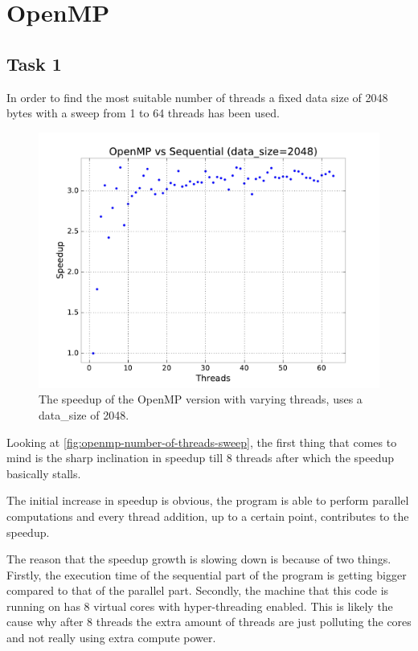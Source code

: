 \documentclass[final]{report}
\begin{document}
\chapter{OpenMP}
\section{Task 1}
In order to find the most suitable number of threads a fixed data size of 2048 bytes with a sweep from 1 to 64 threads has been used.
\begin{figure}[H]
\centering
    \includegraphics[width=\linewidth]{resources/openmp-number-of-threads-sweep.pdf}
    \caption{The speedup of the OpenMP version with varying threads, uses a data\_size of 2048.}
    \label{fig:openmp-number-of-threads-sweep}
\end{figure}
Looking at \autoref{fig:openmp-number-of-threads-sweep}, the first thing that comes to mind is the sharp inclination in speedup till 8 threads after which the speedup basically stalls.

The initial increase in speedup is obvious, the program is able to perform parallel computations and every thread addition, up to a certain point, contributes to the speedup.

The reason that the speedup growth is slowing down is because of two things.
Firstly, the execution time of the sequential part of the program is getting bigger compared to that of the parallel part.
Secondly, the machine that this code is running on has 8 virtual cores with hyper-threading enabled.
This is likely the cause why after 8 threads the extra amount of threads are just polluting the cores and not really using extra compute power.
\end{document}

